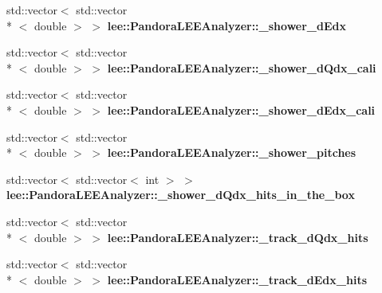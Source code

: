 \begin{DoxyCompactItemize}
\item 
\hypertarget{group__lee_gab709b5ce1a5b80131bd14a57c2e82bf5}{std\-::vector$<$ std\-::vector\\*
$<$ double $>$ $>$ {\bfseries lee\-::\-Pandora\-L\-E\-E\-Analyzer\-::\-\_\-shower\-\_\-d\-Edx}}\label{group__lee_gab709b5ce1a5b80131bd14a57c2e82bf5}

\item 
\hypertarget{group__lee_gaaf81a95a1829c0041e9770be3d09f240}{std\-::vector$<$ std\-::vector\\*
$<$ double $>$ $>$ {\bfseries lee\-::\-Pandora\-L\-E\-E\-Analyzer\-::\-\_\-shower\-\_\-d\-Qdx\-\_\-cali}}\label{group__lee_gaaf81a95a1829c0041e9770be3d09f240}

\item 
\hypertarget{group__lee_gac413e11bfcca3b51ee4ab36ad94e68ba}{std\-::vector$<$ std\-::vector\\*
$<$ double $>$ $>$ {\bfseries lee\-::\-Pandora\-L\-E\-E\-Analyzer\-::\-\_\-shower\-\_\-d\-Edx\-\_\-cali}}\label{group__lee_gac413e11bfcca3b51ee4ab36ad94e68ba}

\item 
\hypertarget{group__lee_gaf56713e8dd07060973767857b7f8508f}{std\-::vector$<$ std\-::vector\\*
$<$ double $>$ $>$ {\bfseries lee\-::\-Pandora\-L\-E\-E\-Analyzer\-::\-\_\-shower\-\_\-pitches}}\label{group__lee_gaf56713e8dd07060973767857b7f8508f}

\item 
\hypertarget{group__lee_ga99371e105e8aa387ee0f0b548f788b57}{std\-::vector$<$ std\-::vector$<$ int $>$ $>$ {\bfseries lee\-::\-Pandora\-L\-E\-E\-Analyzer\-::\-\_\-shower\-\_\-d\-Qdx\-\_\-hits\-\_\-in\-\_\-the\-\_\-box}}\label{group__lee_ga99371e105e8aa387ee0f0b548f788b57}

\item 
\hypertarget{group__lee_ga4aa643d1912fe002773cb2bd1268f0f8}{std\-::vector$<$ std\-::vector\\*
$<$ double $>$ $>$ {\bfseries lee\-::\-Pandora\-L\-E\-E\-Analyzer\-::\-\_\-track\-\_\-d\-Qdx\-\_\-hits}}\label{group__lee_ga4aa643d1912fe002773cb2bd1268f0f8}

\item 
\hypertarget{group__lee_ga3ad01e55fc294c33fcff222f0efa2a1a}{std\-::vector$<$ std\-::vector\\*
$<$ double $>$ $>$ {\bfseries lee\-::\-Pandora\-L\-E\-E\-Analyzer\-::\-\_\-track\-\_\-d\-Edx\-\_\-hits}}\label{group__lee_ga3ad01e55fc294c33fcff222f0efa2a1a}


\end{DoxyCompactItemize}
